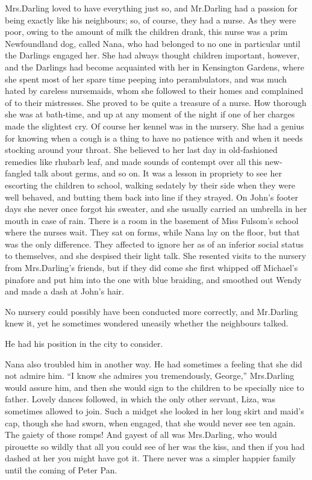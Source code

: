 Mrs.\@ Darling loved to have everything just so,
and Mr.\@ Darling had a passion for being exactly like his neighbours;
so, of course, they had a nurse.
As they were poor, owing to the amount of milk the children drank,
this nurse was a prim Newfoundland dog, called Nana,
who had belonged to no one in particular until the Darlings engaged her.
She had always thought children important, however,
and the Darlings had become acquainted with her in Kensington Gardens,
where she spent most of her spare time peeping into perambulators,
and was much hated by careless nursemaids,
whom she followed to their homes and complained of to their mistresses.
She proved to be quite a treasure of a nurse.
How thorough she was at bath‐time,
and up at any moment of the night if one of her charges made the slightest cry.
Of course her kennel was in the nursery.
She had a genius for knowing when a cough is a thing to have no patience with
and when it needs stocking around your throat.
She believed to her last day in old‐fashioned remedies like rhubarb leaf,
and made sounds of contempt over all this new‐fangled talk about germs, and so on.
It was a lesson in propriety to see her escorting the children to school,
walking sedately by their side when they were well behaved,
and butting them back into line if they strayed.
On John’s footer days she never once forgot his sweater,
and she usually carried an umbrella in her mouth in case of rain.
There is a room in the basement of Miss Fulsom’s school where the nurses wait.
They sat on forms, while Nana lay on the floor, but that was the only difference.
They affected to ignore her as of an inferior social status to themselves,
and she despised their light talk.
She resented visits to the nursery from Mrs.\@ Darling’s friends,
but if they did come she first whipped off Michael’s pinafore and put him into the one with blue braiding,
and smoothed out Wendy and made a dash at John’s hair.

No nursery could possibly have been conducted more correctly, and Mr.\@ Darling knew it,
yet he sometimes wondered uneasily whether the neighbours talked.

He had his position in the city to consider.

Nana also troubled him in another way.
He had sometimes a feeling that she did not admire him.
“I know she admires you tremendously, George,” Mrs.\@ Darling would assure him,
and then she would sign to the children to be specially nice to father.
Lovely dances followed, in which the only other servant, Liza, was sometimes allowed to join.
Such a midget she looked in her long skirt and maid’s cap,
though she had sworn, when engaged, that she would never see ten again.
The gaiety of those romps!
And gayest of all was Mrs.\@ Darling,
who would pirouette so wildly that all you could see of her was the kiss,
and then if you had dashed at her you might have got it.
There never was a simpler happier family until the coming of Peter Pan.

